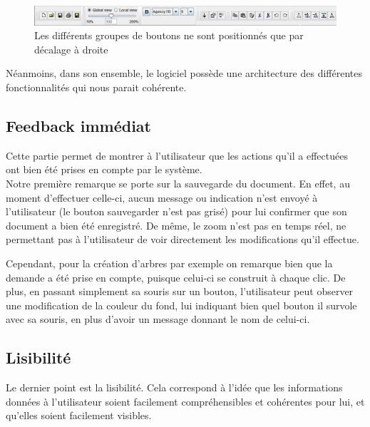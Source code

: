 \documentclass[12pt, a4paper]{article}
\begin{document}
\begin{figure}[h]
\begin{center}
   \includegraphics[scale = 0.5]{agencement.jpg}
	\caption{Les différents groupes de boutons ne sont positionnés que par décalage à droite}
	\end{center}
\end{figure}


Néanmoins, dans son ensemble, le logiciel possède une architecture des différentes fonctionnalités qui nous parait cohérente.  

\subsection{Feedback immédiat}
Cette partie permet de montrer à l'utilisateur que les actions qu'il a effectuées ont bien été prises en compte par le système.\\


Notre première remarque se porte sur la sauvegarde du document. En effet, au moment d'effectuer celle-ci, aucun message ou indication n'est envoyé à l'utilisateur (le bouton sauvegarder n'est pas grisé) pour lui confirmer que son document a bien été enregistré. De même, le zoom n'est pas en temps réel, ne permettant pas à l'utilisateur de voir directement les modifications qu'il effectue. 


Cependant, pour la création d'arbres par exemple on remarque bien que la demande a été prise en compte, puisque celui-ci se construit à chaque clic. De plus, en passant simplement sa souris sur un bouton, l'utilisateur peut observer une modification de la couleur du fond, lui indiquant bien quel bouton il survole avec sa souris, en plus d'avoir un message donnant le nom de celui-ci.
\newpage
\subsection{Lisibilité}
Le dernier point est la lisibilité. Cela correspond à l'idée que les informations données à l’utilisateur soient facilement compréhensibles et cohérentes pour lui, et qu'elles soient facilement visibles.
\end{document}
